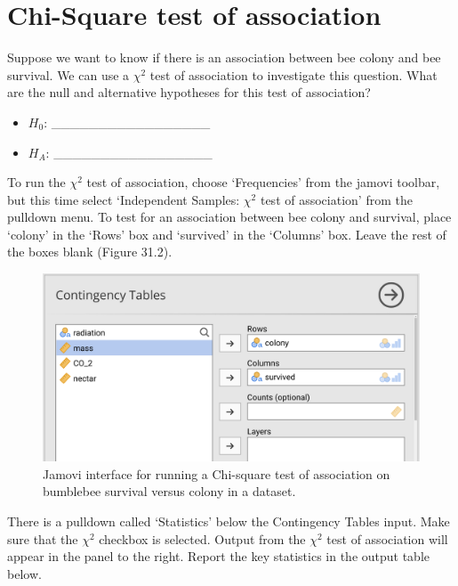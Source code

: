 \documentclass[
  openany]{scrbook}
\begin{document}
\hypertarget{chi-square-test-of-association}{%
\section{Chi-Square test of association}\label{chi-square-test-of-association}}

Suppose we want to know if there is an association between bee colony and bee survival.
We can use a \(\chi^{2}\) test of association to investigate this question.
What are the null and alternative hypotheses for this test of association?

\begin{itemize}
\item
  \(H_{0}\): \_\_\_\_\_\_\_\_\_\_\_\_\_\_\_\_\_
\item
  \(H_{A}\): \_\_\_\_\_\_\_\_\_\_\_\_\_\_\_\_\_
\end{itemize}

To run the \(\chi^{2}\) test of association, choose `Frequencies' from the jamovi toolbar, but this time select `Independent Samples: \(\chi^{2}\) test of association' from the pulldown menu.
To test for an association between bee colony and survival, place `colony' in the `Rows' box and `survived' in the `Columns' box.
Leave the rest of the boxes blank (Figure 31.2).

\begin{figure}
\includegraphics[width=1\linewidth]{img/jamovi_test_of_association_interface} \caption{Jamovi interface for running a Chi-square test of association on bumblebee survival versus colony in a dataset.}\label{fig:unnamed-chunk-133}
\end{figure}

There is a pulldown called `Statistics' below the Contingency Tables input.
Make sure that the \(\chi^{2}\) checkbox is selected.
Output from the \(\chi^{2}\) test of association will appear in the panel to the right.
Report the key statistics in the output table below.
\end{document}
